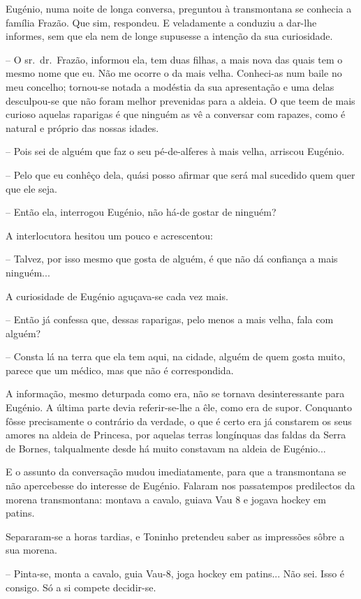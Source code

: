 \documentclass[9pt]{article}
\begin{document}
Eugé\-nio, numa noite de longa conversa, preguntou à transmontana se conhecia a fa\-mí\-lia Frazão. Que sim, respondeu. E veladamente a conduziu a dar-\-lhe informes, sem
que ela nem de longe supusesse a inten\-ção da sua curiosidade.

-- O sr.\ dr.\ Frazão, informou ela, tem duas fi\-lhas, a mais nova das quais
tem o mesmo nome que eu. Não me ocorre o da mais ve\-lha. Conheci-as num
baile no meu conce\-lho; tornou-se notada a modéstia da sua apresenta\-ção
e uma delas desculpou-se que não foram me\-lhor prevenidas para a aldeia.
O que teem de mais curioso aquelas raparigas é que nin\-guém as vê a conversar
com rapazes, como é natural e próprio das nossas idades.

-- Pois sei de alguém que faz o seu pé-de-alferes à mais ve\-lha, arriscou Eugé\-nio.

-- Pelo que eu conhêço dela, quási posso afirmar que será mal sucedido
quem quer que ele seja.

-- Então ela, interrogou Eugé\-nio, não há-de gostar de nin\-guém?

A interlocutora hesitou um pouco e acrescentou:

-- Talvez, por isso mesmo que gosta de alguém, é que não dá confian\-ça
a mais nin\-guém...

A curiosidade de Eugé\-nio aguçava-se cada vez mais.

-- Então já confessa que, dessas raparigas, pelo menos a mais ve\-lha, fala com alguém?

-- Consta lá na terra que ela tem aqui, na cidade, alguém de quem gosta
muito, parece que um médico, mas que não é correspondida.

A informa\-ção, mesmo deturpada como era, não se tornava desinteressante para
Eugé\-nio. A última parte devia referir-se-\-lhe a êle, como era de supor.
Conquanto fôsse precisamente o contrário da verdade, o que é certo era já
constarem os seus amores na aldeia de Princesa, por aquelas terras longínquas das faldas da Serra
de Bornes, talqualmente desde há muito constavam na aldeia de Eugé\-nio...

E o assunto da conversa\-ção mudou imediatamente, para que a transmontana se não apercebesse do interesse de Eugé\-nio. Falaram nos passatempos predilectos da morena transmontana: montava a cavalo, guiava Vau 8 e jogava hockey em patins.

Separaram-se a horas tardias, e Toninho pretendeu saber as im\-pres\-sões
sôbre a sua morena.

-- Pinta-se, monta a cavalo, guia Vau-8, joga hockey em patins... Não sei.
Isso é consigo. Só a si compete decidir-se.
\end{document}
